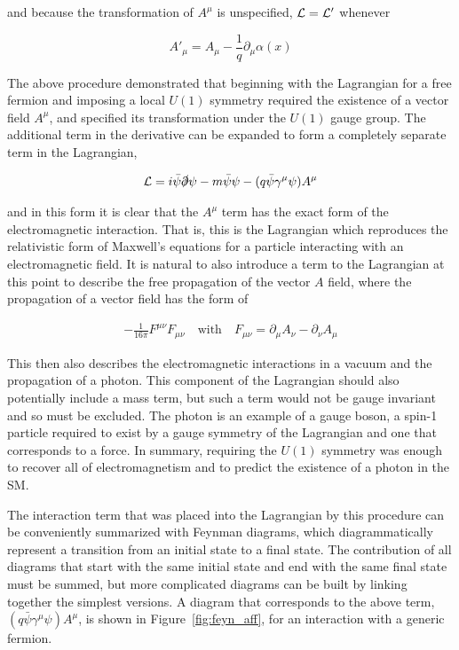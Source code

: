 \noindent and because the transformation of $A^\mu$ is unspecified, $\mathcal{L} = \mathcal{L}'$ whenever

\[  A'_\mu =  A_{\mu} - \frac{1}{q}\partial_\mu\alpha(x) \]

The above procedure demonstrated that beginning with the Lagrangian for a free fermion and imposing a local $U(1)$ symmetry required the existence of a vector field $A^\mu$, and specified its transformation under the $U(1)$ gauge group.
The additional term in the derivative can be expanded to form a completely separate term in the Lagrangian,

\begin{align}
\mathcal{L} = i\bar{\psi}\slashed{\partial}\psi -m\bar{\psi}\psi - (q\bar{\psi}\gamma^\mu\psi)A^\mu
\end{align}

\noindent and in this form it is clear that the $A^\mu$ term has the exact form of the electromagnetic interaction.
That is, this is the Lagrangian which reproduces the relativistic form of Maxwell's equations for a particle interacting with an electromagnetic field.
It is natural to also introduce a term to the Lagrangian at this point to describe the free propagation of the vector $A$ field, where the propagation of a vector field has the form of

\begin{align}
- \frac{1}{16\pi} F^{\mu\nu}F_{\mu\nu} \quad \mathrm{with} \quad F_{\mu\nu} = \partial_\mu A_\nu - \partial_\nu A_\mu
\end{align}

\noindent This then also describes the electromagnetic interactions in a vacuum and the propagation of a photon.
This component of the Lagrangian should also potentially include a mass term, but such a term would not be gauge invariant and so must be excluded.
The photon is an example of a gauge boson, a spin-1 particle required to exist by a gauge symmetry of the Lagrangian and one that corresponds to a force.
In summary, requiring the $U(1)$ symmetry was enough to recover all of electromagnetism and to predict the existence of a photon in the \ac{SM}. 

The interaction term that was placed into the Lagrangian by this procedure can be conveniently summarized with Feynman diagrams, which diagrammatically represent a transition from an initial state to a final state.
The contribution of all diagrams that start with the same initial state and end with the same final state must be summed, but more complicated diagrams can be built by linking together the simplest versions.
A diagram that corresponds to the above term, $(q\bar{\psi}\gamma^\mu\psi)A^\mu$, is shown in Figure~\ref{fig:feyn_aff}, for an interaction with a generic fermion.

